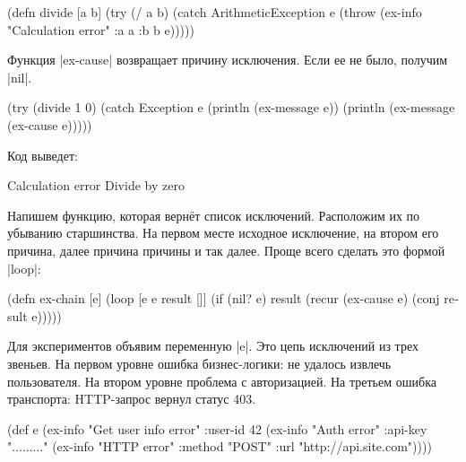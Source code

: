 \begin{english}
  \begin{clojure}
(defn divide [a b]
  (try
    (/ a b)
    (catch ArithmeticException e
      (throw (ex-info
              "Calculation error"
              {:a a :b b}
              e)))))
  \end{clojure}
\end{english}

Функция \spverb|ex-cause| возвращает причину исключения. Если ее не было,
получим \spverb|nil|.

\begin{english}
  \begin{clojure}
(try
  (divide 1 0)
  (catch Exception e
    (println (ex-message e))
    (println (ex-message (ex-cause e)))))
  \end{clojure}
\end{english}

\noindent
Код выведет:

\begin{english}
  \begin{text}
Calculation error
Divide by zero
  \end{text}
\end{english}

Напишем функцию, которая верн\"{е}т список исключений. Расположим их по убыванию
старшинства. На первом месте исходное исключение, на втором его причина, далее
причина причины и так далее. Проще всего сделать это формой \spverb|loop|:

\begin{english}
  \begin{clojure}
(defn ex-chain [e]
  (loop [e e
         result []]
    (if (nil? e)
      result
      (recur (ex-cause e) (conj result e)))))
  \end{clojure}
\end{english}

Для экспериментов объявим переменную \spverb|e|. Это цепь исключений из трех
звеньев. На первом уровне ошибка бизнес-логики: не удалось извлечь
пользователя. На втором уровне проблема с авторизацией. На третьем ошибка
транспорта: HTTP-запрос вернул статус 403.

\begin{english}
  \begin{clojure}
(def e
  (ex-info
   "Get user info error"
   {:user-id 42}
   (ex-info "Auth error"
            {:api-key "........."}
            (ex-info "HTTP error"
                     {:method "POST"
                      :url "http://api.site.com"}))))
  \end{clojure}
\end{english}

